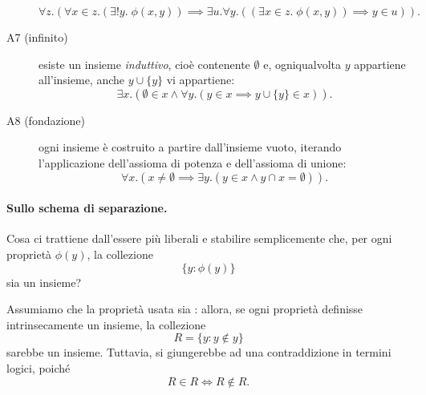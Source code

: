 \begin{description}
  \begin{equation}
    \forall z. \left(\forall x \in z. \left(\exists!y.\; \phi(x,y)\right) \implies \exists u. \forall y. \left((\exists x \in z. \; \phi(x,y)) \implies y \in u\right)\right).
  \end{equation}
  \item[A7 (infinito)] esiste un insieme \emph{induttivo}, cioè contenente \(\emptyset{}\) e, ogniqualvolta \(y\) appartiene all'insieme, anche \(y \cup \lbrace y \rbrace\) vi appartiene:
  \begin{equation}
    \exists x.\left(\emptyset \in x \land \forall y.\left(y \in x \implies y \cup \lbrace y \rbrace \in x \right)\right).
  \end{equation}
  \item[A8 (fondazione)] ogni insieme è costruito a partire dall'insieme vuoto, iterando l'applicazione dell'assioma di potenza e dell'assioma di unione:
  \begin{equation}
    \forall x.\left(x \ne \emptyset \implies \exists y.\left(y \in x \land y \cap x = \emptyset\right)\right).
  \end{equation}
\end{description}

\paragraph{Sullo schema di separazione.} Cosa ci trattiene dall'essere più liberali e stabilire semplicemente che, per ogni proprietà \(\phi(y)\), la collezione
\begin{equation}
  \lbrace y \colon \phi(y) \rbrace
\end{equation}
sia un insieme?

Assumiamo che la proprietà usata sia : allora, se ogni proprietà definisse intrinsecamente un insieme, la collezione
\begin{equation}
  R = \lbrace y \colon y \notin y \rbrace
\end{equation}
sarebbe un insieme. Tuttavia, si giungerebbe ad una contraddizione in termini logici, poiché
\begin{equation}
  R \in R \iff R \notin R.
\end{equation}

